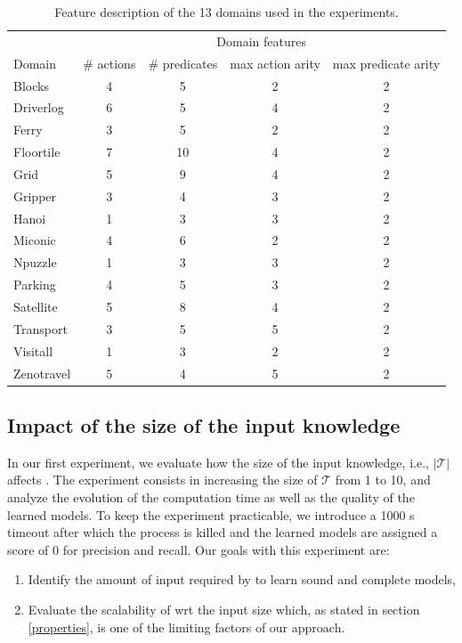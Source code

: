 \begin{table}[hbt!]
		\begin{center}
			\begin{tabular}{l|c|c|c|c|}	
				& \multicolumn{4}{c|}{Domain features}\\ \cline{2-5}
				Domain & \# actions & \# predicates & max action arity & max predicate arity  \\
				\hline
				Blocks & 4 & 5 & 2 & 2  \\
				Driverlog & 6 & 5 & 4 & 2  \\
				Ferry & 3 & 5 & 2 & 2  \\
				Floortile & 7 & 10 & 4 & 2  \\
				Grid & 5 & 9 & 4 & 2  \\
				Gripper & 3 & 4 & 3 & 2  \\
				Hanoi & 1 & 3 & 3 & 2  \\
				Miconic & 4 & 6 & 2 & 2  \\
				Npuzzle & 1 & 3 & 3 & 2  \\
				Parking & 4 & 5 & 3 & 2  \\
				Satellite & 5 & 8 & 4 & 2  \\
				Transport & 3 & 5 & 5 & 2  \\
				Visitall & 1 & 3 & 2 & 2  \\
				Zenotravel & 5 & 4 & 5 & 2
			\end{tabular}
		\end{center}
	\caption{\small Feature description of the 13 domains used in the experiments.}
	\label{tab:domain_features}	
\end{table}

\subsection{Impact of the size of the input knowledge}
In our first experiment, we evaluate how the size of the input knowledge, i.e., $\left|\mathcal{T}\right|$ affects \FAMA. The experiment consists in increasing the size of $\mathcal{T}$ from 1 to 10, and analyze the evolution of the computation time as well as the quality of the learned models. To keep the experiment practicable, we introduce a 1000 s timeout after which the process is killed and the learned models are assigned a score of 0 for precision and recall.
Our goals with this experiment are:
\begin{enumerate}
	\item Identify the amount of input required by \FAMA to learn sound and complete models,
	\item Evaluate the scalability of \FAMA wrt the input size which, as stated in section \ref{properties}, is one of the limiting factors of our approach.
\end{enumerate} 

